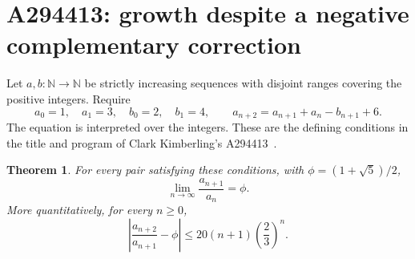 \documentclass[11pt]{article}
\newtheorem{theorem}{Theorem}[section]
\newcommand{\N}{\mathbb N}
\begin{document}
\section{A294413: growth despite a negative complementary correction}

Let $a,b:\N\to\N$ be strictly increasing sequences with disjoint ranges
covering the positive integers. Require
\[
 a_0=1,\quad a_1=3,\quad b_0=2,\quad b_1=4,
 \qquad a_{n+2}=a_{n+1}+a_n-b_{n+1}+6.
\]
The equation is interpreted over the integers. These are the defining
conditions in the title and program of Clark Kimberling's
A294413~\cite{A294413}.

\begin{theorem}\label{thm:ratio}
For every pair satisfying these conditions, with
$\phi=(1+\sqrt5)/2$,
\[
 \lim_{n\to\infty}\frac{a_{n+1}}{a_n}=\phi.
\]
More quantitatively, for every $n\ge0$,
\[
 \left|\frac{a_{n+2}}{a_{n+1}}-\phi\right|
 \le20(n+1)\left(\frac23\right)^n.
\]
\end{theorem}
\end{document}
